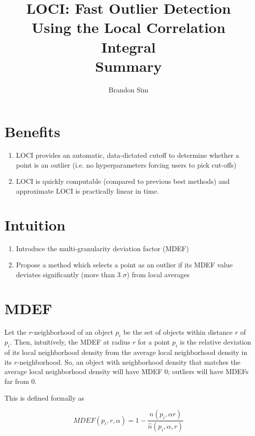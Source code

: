 \documentclass[12pt]{article}
\begin{document}
\title{LOCI: Fast Outlier Detection Using the Local Correlation Integral\\Summary}
\author{Brandon Sim}

\maketitle

\section{Benefits}
\begin{enumerate}
\item LOCI provides an automatic, data-dictated cutoff to determine whether a point is an outlier (i.e. no hyperparameters forcing users to pick cut-offs)
\item LOCI is quickly computable (compared to previous best methods) and approximate LOCI is practically linear in time.
\end{enumerate}

\section{Intuition}

\begin{enumerate}
\item Introduce the multi-granularity deviation factor (MDEF)
\item Propose a method which selects a point as an outlier if its MDEF value deviates significantly (more than 3 $\sigma$) from local averages
\end{enumerate}

\section{MDEF}
Let the $r$-neighborhood of an object $p_i$ be the set of objects within distance $r$ of $p_i$. Then, intuitively, the MDEF at radius $r$ for a point $p_i$ is the relative deviation of its local neighborhood density from the average local neighborhood density in its $r$-neighborhood. So, an object with neighborhood density that matches the average local neighborhood density will have MDEF 0; outliers will have MDEFs far from 0.

This is defined formally as 

\begin{equation}
MDEF(p_i, r, \alpha) = 1 - \frac{n(p_i, \alpha r)}{\hat{n}(p_i, \alpha, r)}
\end{equation}
\end{document}
